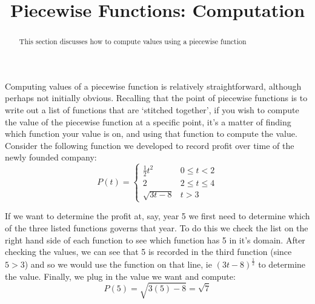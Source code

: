 \documentclass{ximeraXloud}
\title{Piecewise Functions: Computation}
\begin{document}
\begin{abstract}
    This section discusses how to compute values using a piecewise function
\end{abstract}
\maketitle

Computing values of a piecewise function is relatively straightforward, although perhaps not initially obvious. Recalling that the point of piecewise functions is to write out a list of functions that are `stitched together', if you wish to compute the value of the piecewise function at a specific point, it's a matter of finding which function your value is on, and using that function to compute the value. Consider the following function we developed to record profit over time of the newly founded company:
\[
    P(t) =
        \begin{cases}
            {\frac{1}{2}t^2} & 0\leq t < 2 \\
            {2} & 2 \leq t \leq 4 \\
            \sqrt{3t-8} & t > 3
        \end{cases}
\]

If we want to determine the profit at, say, year 5 we first need to determine which of the three listed functions governs that year. To do this we check the list on the right hand side of each function to see which function has 5 in it's domain. After checking the values, we can see that 5 is recorded in the third function (since $5 > 3$) and so we would use the function on that line, ie $\left(3t-8\right)^{\frac{1}{2}}$ to determine the value. Finally, we plug in the value we want and compute:
\[
    P(5) = \sqrt{3(5)-8} = \sqrt{7}
\]
\end{document}
